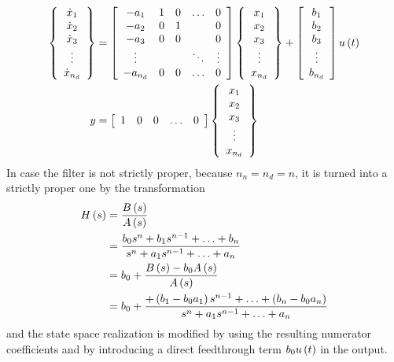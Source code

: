 \begin{align*}
	\cubr{\cvvect{
		\dot{x}_1 \\
		\dot{x}_2 \\
		\dot{x}_3 \\
		\vdots \\
		\dot{x}_{n_d}
	}} &= \sqbr{\matr{ccccc}{
		-a_1 & 1 & 0 & \ldots & 0 \\
		-a_2 & 0 & 1 & & 0 \\
		-a_3 & 0 & 0 & & 0 \\
		\vdots & & & \ddots & \vdots \\
		-a_{n_d} & 0 & 0 & \ldots & 0
	}} \cubr{\cvvect{
		x_1 \\
		x_2 \\
		x_3 \\
		\vdots \\
		x_{n_d}
	}} + \sqbr{\cvvect{
		b_1 \\
		b_2 \\
		b_3 \\
		\vdots \\
		b_{n_d}
	}} u\plbr{t} \\
	y &= \sqbr{\matr{ccccc}{
		1 & 0 & 0 & \ldots & 0
	}} \cubr{\cvvect{
		x_1 \\
		x_2 \\
		x_3 \\
		\vdots \\
		x_{n_d}
	}}
\end{align*}
In case the filter is not strictly proper, because $n_n=n_d=n$,
it is turned into a strictly proper one by the transformation
\begin{align*}
	H\plbr{s}
	&= \frac{B\plbr{s}}{A\plbr{s}} \\
	&= \frac{
		b_0 s^n
		+ b_1 s^{n-1}
		+ \ldots
		+ b_n
	}{
		s^n
		+ a_1 s^{n-1}
		+ \ldots
		+ a_n
	} \\
	&= b_0 + \frac{B\plbr{s} - b_0 A\plbr{s}}{A\plbr{s}} \\
	&= b_0 + \frac{
		+ \plbr{b_1 - b_0 a_1} s^{n-1}
		+ \ldots
		+ \plbr{b_n - b_0 a_n}
	}{
		s^n
		+ a_1 s^{n-1}
		+ \ldots
		+ a_n
	}
\end{align*}
and the state space realization is modified by using the resulting 
numerator coefficients and by introducing a direct feedthrough term
$b_0 u\plbr{t}$ in the output.


